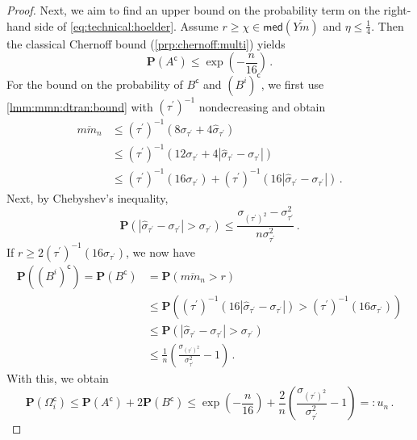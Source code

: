 \documentclass[10pt,a4paper]{amsart}
\renewcommand{\Pr}{\mathbf{P}} %
\newcommand{\PrOf}[1]{\Pr\brOf{#1}}
\newcommand{\absOf}[1]{\left\vert #1 \right\vert} %
\newcommand{\br}[1]{\lb #1 \rb} %
\newcommand{\brOf}[1]{\!\br{#1}} %
\newcommand{\compl}{^\mathsf{c}}%
\newcommand{\dtran}{\tau\pr}
\newcommand{\eqfs}{\,.}
\newcommand{\invdtran}{(\tau\pr)^{-1}}
\newcommand{\lb}{\left(} %
\newcommand{\median}{\mathsf{med}}
\newcommand{\ol}[2]{\overline{#1#2}}
\newcommand{\pr}{^\prime}
\newcommand{\rb}{\right)} %
\begin{document}
\begin{proof}
    Next, we aim to find an upper bound on the probability term on the right-hand side of \eqref{eq:technical:hoelder}.
    Assume $r \geq \chi \in  \median(\ol Ym)$ and $\eta \leq \frac14$. Then the classical Chernoff bound (\cref{prp:chernoff:multi}) yields
    \begin{equation}
        \PrOf{A\compl} \leq \exp\brOf{-\frac{n}{16}}
        \eqfs
    \end{equation}
    For the bound on the probability of $B\compl$ and $(B^i)\compl$, we first use \cref{lmm:mmn:dtran:bound} with $\invdtran$ nondecreasing and obtain
    \begin{align}
        \ol m{m_n}
        &\leq
        \invdtran\brOf{8 \sigma_{\dtran} + 4 \hat \sigma_{\dtran}} 
        \\&\leq
        \invdtran\brOf{12 \sigma_{\dtran} + 4 \absOf{ \hat \sigma_{\dtran}- \sigma_{\dtran} }} 
        \\&\leq
        \invdtran\brOf{16 \sigma_{\dtran}} + \invdtran\brOf{16 \absOf{ \hat \sigma_{\dtran}- \sigma_{\dtran} }} 
        \eqfs
    \end{align}
    Next, by Chebyshev's inequality,
    \begin{equation}
        \PrOf{\absOf{\hat \sigma_{\dtran}- \sigma_{\dtran} } > \sigma_{\dtran}} \leq \frac{\sigma_{(\dtran)^2} - \sigma_{\dtran}^2}{n \sigma_{\dtran}^2}
        \eqfs
    \end{equation}
    If $r\geq 2 \invdtran\brOf{16 \sigma_{\dtran}}$, we now have
    \begin{align}
        \PrOf{(B^i)\compl} 
        =
        \PrOf{B\compl}
        &= 
        \PrOf{\ol m{m_n} > r} 
        \\&\leq 
        \PrOf{\invdtran\brOf{16 \absOf{ \hat \sigma_{\dtran}- \sigma_{\dtran}}} > \invdtran\brOf{16 \sigma_{\dtran}}}
        \\&\leq 
        \PrOf{\absOf{ \hat \sigma_{\dtran}- \sigma_{\dtran}} > \sigma_{\dtran}}
        \\&\leq
        \frac1n \br{\frac{\sigma_{(\dtran)^2}}{\sigma_{\dtran}^2} -1}
        \eqfs
    \end{align}
    With this, we obtain
    \begin{equation}
        \PrOf{\Omega_i\compl}
        \leq 
        \PrOf{A\compl} + 2\PrOf{B\compl}
        \leq 
        \exp\brOf{-\frac{n}{16}} +  \frac2n \br{\frac{\sigma_{(\dtran)^2}}{\sigma_{\dtran}^2}-1}
        =:
        u_n
        \eqfs
    \end{equation}
    

\end{proof}
\end{document}
